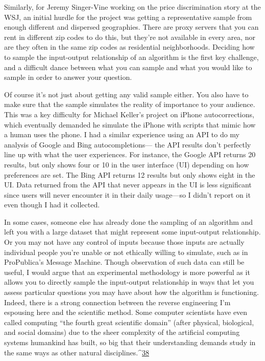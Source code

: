 Similarly, for Jeremy Singer-Vine working on the price discrimination story at the WSJ, an initial hurdle for the project was getting a representative sample from enough different and dispersed geographies. There are proxy servers that you can rent in different zip codes to do this, but they're not available in every area, nor are they often in the same zip codes as residential neighborhoods. Deciding how to sample the input-output relationship of an algorithm is the first key challenge, and a difficult dance between what you can sample and what you would like to sample in order to answer your question. 

Of course it's not just about getting any valid sample either. You also have to make sure that the sample simulates the reality of importance to your audience. This was a key difficulty for Michael Keller's project on iPhone autocorrections, which eventually demanded he simulate the iPhone with scripts that mimic how a human uses the phone. I had a similar experience using an API to do my analysis of Google and Bing autocompletions— the API results don't perfectly line up with what the user experiences. For instance, the Google API returns 20 results, but only shows four or 10 in the user interface (UI) depending on how preferences are set. The Bing API returns 12 results but only shows eight in the UI. Data returned from the API that never appears in the UI is less significant since users will never encounter it in their daily usage—so I didn't report on it even though I had it collected. 

In some cases, someone else has already done the sampling of an algorithm and left you with a large dataset that might represent some input-output relationship. Or you may not have any control of inputs because those inputs are actually individual people you're unable or not ethically willing to simulate, such as in ProPublica's Message Machine. Though observation of such data can still be useful, I would argue that an experimental methodology is more powerful as it allows you to directly sample the input-output relationship in ways that let you assess particular questions you may have about how the algorithm is functioning. Indeed, there is a strong connection between the reverse engineering I'm espousing here and the scientific method. Some computer scientists have even called computing ``the fourth great scientific domain'' (after physical, biological, and social domains) due to the sheer complexity of the artificial computing systems humankind has built, so big that their understanding demands study in the same ways as other natural disciplines.^{\href{#endnotes}{38}}


